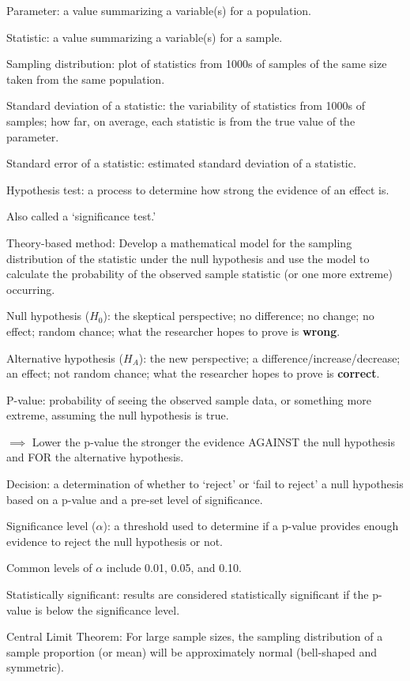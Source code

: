 \documentclass[
]{report}
\newcommand{\rgi}{\hspace{24pt}}  %
\begin{document}
Parameter: a value summarizing a variable(s) for a population.

Statistic: a value summarizing a variable(s) for a sample.

Sampling distribution: plot of statistics from 1000s of samples of the same size taken from the same population.

Standard deviation of a statistic: the variability of statistics from 1000s of samples; how far, on average, each statistic is from the true value of the parameter.

Standard error of a statistic: estimated standard deviation of a statistic.

Hypothesis test: a process to determine how strong the evidence of an effect is.

\rgi Also called a `significance test.'

Theory-based method: Develop a mathematical model for the sampling distribution of the statistic under the null hypothesis and use the model to calculate the probability of the observed sample statistic (or one more extreme) occurring.

Null hypothesis (\(H_0\)): the skeptical perspective; no difference; no change; no effect; random chance; what the researcher hopes to prove is \textbf{wrong}.

Alternative hypothesis (\(H_A\)): the new perspective; a difference/increase/decrease; an effect; not random chance; what the researcher hopes to prove is \textbf{correct}.

P-value: probability of seeing the observed sample data, or something more extreme, assuming the null hypothesis is true.

\(\implies\) Lower the p-value the stronger the evidence AGAINST the null hypothesis and FOR the alternative hypothesis.

Decision: a determination of whether to `reject' or `fail to reject' a null hypothesis based on a p-value and a pre-set level of significance.

Significance level (\(\alpha\)): a threshold used to determine if a p-value provides enough evidence to reject the null hypothesis or not.

\rgi Common levels of \(\alpha\) include 0.01, 0.05, and 0.10.

Statistically significant: results are considered statistically significant if the p-value is below the significance level.

Central Limit Theorem: For large sample sizes, the sampling distribution of a sample proportion (or mean) will be approximately normal (bell-shaped and symmetric).
\end{document}
